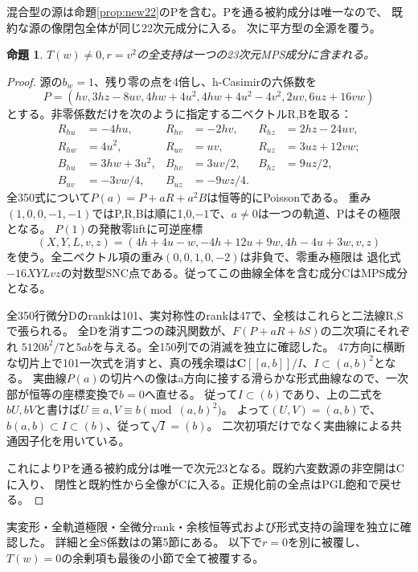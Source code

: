 \documentclass[a4paper,11pt]{ltjsarticle}
\newtheorem{proposition}{命題}[section]
\theoremstyle{definition}
\newcommand{\CC}{\mathbf C}
\begin{document}
混合型の源は命題\ref{prop:new22}のPを含む。Pを通る被約成分は唯一なので、
既約な源の像閉包全体が同じ22次元成分に入る。
次に平方型の全源を覆う。
\begin{proposition}\label{prop:rank3-square}
$T(w)\ne0,r=v^2$の全支持は一つの23次元MPS成分に含まれる。
\end{proposition}
\begin{proof}
源の$b_w=1$、残り零の点を4倍し、h-Casimirの六係数を
\[
 P=(hv,3hz-8uv,4hw+4u^2,4hw+4u^2-4v^2,2uv,6uz+16vw)
\]
とする。非零係数だけを次のように指定する二ベクトルR,Bを取る：
\[
\begin{aligned}
R_{hu}&=-4hu,&R_{hv}&=-2hv,&R_{hz}&=2hz-24uv,\\
R_{hw}&=4u^2,&R_{uv}&=uv,&R_{uz}&=3uz+12vw;\\
B_{hu}&=3hw+3u^2,&B_{hv}&=3uv/2,&B_{hz}&=9uz/2,\\
B_{uv}&=-3vw/4,&B_{uz}&=-9wz/4.
\end{aligned}
\]
全350式について$P(a)=P+aR+a^2B$は恒等的にPoissonである。
重み$(1,0,0,-1,-1)$ではP,R,Bは順に1,0,$-1$で、$a\ne0$は一つの軌道、Pはその極限となる。
$P(1)$の発散零liftに可逆座標
\[
 (X,Y,L,v,z)=(4h+4u-w,-4h+12u+9w,4h-4u+3w,v,z)
\]
を使う。全二ベクトル項の重み$(0,0,1,0,-2)$は非負で、零重み極限は
退化式$-16XYLvz$の対数型SNC点である。従ってこの曲線全体を含む成分CはMPS成分となる。

全350行微分Dのrankは101、実対称性のrankは47で、全核はこれらと二法線R,Sで張られる。
全Dを消す二つの疎汎関数が、$F(P+aR+bS)$の二次項にそれぞれ
$5120b^2/7$と$5ab$を与える。全150列での消滅を独立に確認した。
47方向に横断な切片上で101一次式を消すと、真の残余環は$\CC[[a,b]]/I$、$I\subset(a,b)^2$となる。
実曲線$P(a)$の切片への像はa方向に接する滑らかな形式曲線なので、一次部が恒等の座標変換で$b=0$へ直せる。
従って$I\subset(b)$であり、上の二式を$bU,bV$と書けば$U\equiv a,V\equiv b\pmod{(a,b)^2}$。
よって$(U,V)=(a,b)$で、$b(a,b)\subset I\subset(b)$、従って$\sqrt I=(b)$。
二次初項だけでなく実曲線による共通因子化を用いている。

これによりPを通る被約成分は唯一で次元23となる。既約六変数源の非空開はCに入り、
閉性と既約性から全像がCに入る。正規化前の全点はPGL飽和で戻せる。
\end{proof}
実変形・全軌道極限・全微分rank・余核恒等式および形式支持の論理を独立に確認した。
詳細と全S係数はの第5節にある。
以下で$r=0$を別に被覆し、$T(w)=0$の余剰項も最後の小節で全て被覆する。
\end{document}

